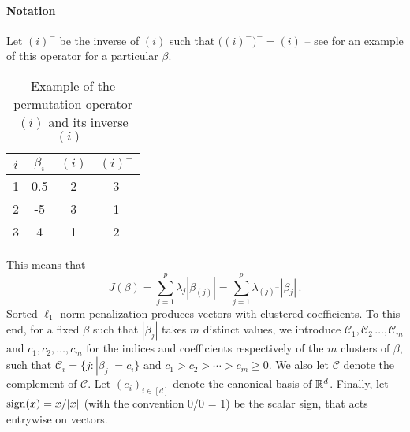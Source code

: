 \paragraph{Notation}\label{sec:notation}

Let \((i)^{-}\) be the inverse of \((i)\) such that
\(\big((i)^-\big)^- = (i)\) -- see  for an
example of this operator for a particular \(\beta\).
\begin{table}
  \centering
  \caption{Example of the permutation operator \((i)\) and its inverse
    \((i)^-\)\label{tab:permutation-example}}
  \begin{tabular}{cccc}
    \toprule
    \(i\) & \(\beta_i\) & \((i)\) & \((i)^-\) \\
    \midrule
    1     & 0.5         & 2       & 3         \\
    2     & -5          & 3       & 1         \\
    3     & 4           & 1       & 2         \\
    \bottomrule
  \end{tabular}
\end{table}
This means that
\[
  J(\beta) = \sum_{j=1}^p \lambda_j |\beta_{(j)}|
  = \sum_{j=1}^p \lambda_{(j)^-}|\beta_j| \,.
\]
Sorted $\ell_1$ norm penalization produces vectors with clustered coefficients.
To this end, for a fixed $\beta$ such that $|\beta_j|$ takes $m$ distinct values, we introduce \(\mathcal{C}_1, \mathcal{C}_2\, \dots, \mathcal{C}_m\) and \(c_1,
c_2, \dots, c_m\) for the indices and coefficients respectively of the \(m\)
clusters of $\beta$, such that
  $
  \mathcal{C}_i = \{j : |\beta_j| = c_i\} \text{ and }%
  c_1 > c_2 > \cdots > c_m \geq 0.
  $
We also let \(\bar{\mathcal{C}}\) denote the complement of \(\mathcal{C}\).
Let $(e_i)_{i \in [d]}$ denote the canonical basis of $\mathbb{R}^d$.
Finally, let $\operatorname{sign}(x) = x / |x|$ (with the convention 0/0 = 1) be the scalar sign, that acts entrywise on vectors.


